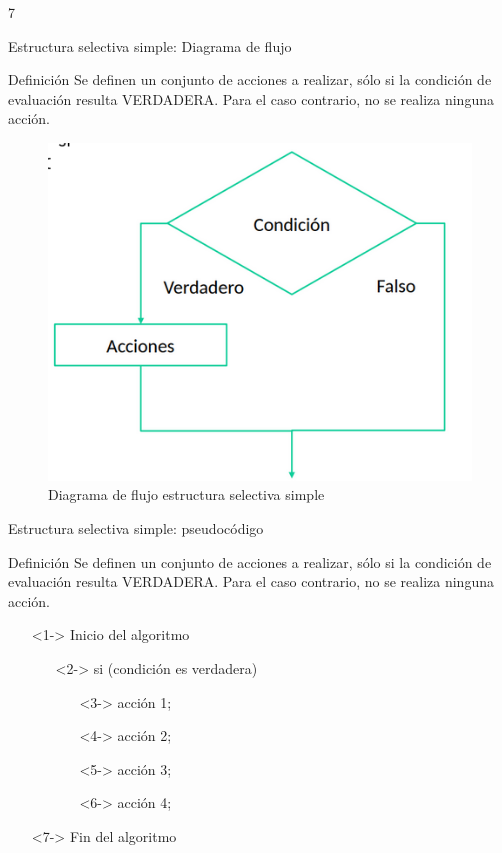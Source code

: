 7\documentclass[xcolor=pdftex,table,11pt]{beamer}
\begin{document}
\begin{frame}{Estructura selectiva simple: Diagrama de flujo}
\begin{block}{Definición}
Se definen un conjunto de acciones a realizar, sólo si la condición de evaluación resulta VERDADERA. Para el caso contrario, no se realiza ninguna acción. 
\end{block}


 \begin{figure}
 \centering
\includegraphics[scale=0.3]{../img/exported/if.png}
\caption{Diagrama de flujo estructura selectiva simple}
\end{figure}

\end{frame}


\begin{frame}{Estructura selectiva simple: pseudocódigo}
\begin{block}{Definición}
Se definen un conjunto de acciones a realizar, sólo si la condición de evaluación resulta VERDADERA. Para el caso contrario, no se realiza ninguna acción. 
\end{block}

 \begin{itemize}
   \item[]<1-> Inicio del algoritmo

   \begin{itemize}
   
     	\item[]<2-> si (condición es verdadera)
     	\begin{itemize}
     			\item[]<3->  acción 1;
     			\item[]<4->  acción 2;
     			\item[]<5->  acción 3;
     			\item[]<6->  acción 4;
     	\end{itemize}
     	 
   \end{itemize}
  \item[]<7-> Fin del algoritmo
\end{itemize}

\end{frame}
\end{document}
